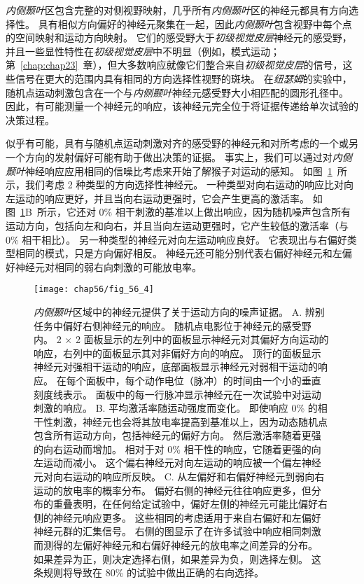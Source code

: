 \textit{内侧颞叶}区包含完整的对侧视野映射，几乎所有\textit{内侧颞叶}区的神经元都具有方向选择性。
具有相似方向偏好的神经元聚集在一起，因此\textit{内侧颞叶}包含视野中每个点的空间映射和运动方向映射。
它们的感受野大于\textit{初级视觉皮层}神经元的感受野，并且一些显性特性在\textit{初级视觉皮层}中不明显（例如，模式运动；第~\ref{chap:chap23}~章），但大多数响应就像它们整合来自\textit{初级视觉皮层}的信号，这些信号在更大的范围内具有相同的方向选择性视野的斑块。
在\textit{纽瑟姆}的实验中，随机点运动刺激包含在一个与\textit{内侧颞叶}神经元感受野大小相匹配的圆形孔径中。
因此，有可能测量一个神经元的响应，该神经元完全位于将证据传递给单次试验的决策过程。


似乎有可能，具有与随机点运动刺激对齐的感受野的神经元和对所考虑的一个或另一个方向的发射偏好可能有助于做出决策的证据。
事实上，我们可以通过对\textit{内侧颞叶}神经响应应用相同的信噪比考虑来开始了解猴子对运动的感知。
如图~\ref{fig:56_4}~所示，我们考虑 2 种类型的方向选择性神经元。
一种类型对向右运动的响应比对向左运动的响应更好，并且当向右运动更强时，它会产生更高的激活率。
如图~\ref{fig:56_4}B~所示，它还对 0\% 相干刺激的基准以上做出响应，因为随机噪声包含所有运动方向，包括向左和向右，并且当向左运动更强时，它产生较低的激活率（与 0\% 相干相比）。
另一种类型的神经元对向左运动响应良好。
它表现出与右偏好类型相同的模式，只是方向偏好相反。
神经元还可能分别代表右偏好神经元和左偏好神经元对相同的弱右向刺激的可能放电率。


\begin{figure}[htbp]
	\centering
	\texttt{[image: chap56/fig\_56\_4]}
	\caption{\textit{内侧颞叶}区域中的神经元提供了关于运动方向的噪声证据。
		A. 辨别任务中偏好右侧神经元的响应。
		随机点电影位于神经元的感受野内。
		2 $\times$ 2 面板显示的左列中的面板显示神经元对其偏好方向运动的响应，右列中的面板显示其对非偏好方向的响应。
		顶行的面板显示神经元对强相干运动的响应，底部面板显示神经元对弱相干运动的响应。
		在每个面板中，每个动作电位（脉冲）的时间由一个小的垂直刻度线表示。
		面板中的每一行脉冲显示神经元在一次试验中对运动刺激的响应\cite{mazurek2003role}。
		B. 平均激活率随运动强度而变化。
		即使响应 0\% 的相干性刺激，神经元也会将其放电率提高到基准以上，因为动态随机点包含所有运动方向，包括神经元的偏好方向。
		然后激活率随着更强的向右运动而增加。
		相对于对 0\% 相干性的响应，它随着更强的向左运动而减小。
		这个偏右神经元对向左运动的响应被一个偏左神经元对向右运动的响应所反映。
		C. 从左偏好和右偏好神经元到弱向右运动的放电率的概率分布。
		偏好右侧的神经元往往响应更多，但分布的重叠表明，在任何给定试验中，偏好左侧的神经元可能比偏好右侧的神经元响应更多。
		这些相同的考虑适用于来自右偏好和左偏好神经元群的汇集信号。
		右侧的图显示了在许多试验中响应相同刺激而测得的左偏好神经元和右偏好神经元的放电率之间差异的分布。
		如果差异为正，则决定选择右侧，如果差异为负，则选择左侧。
		这条规则将导致在 80\% 的试验中做出正确的右向选择。}
	\label{fig:56_4}
\end{figure}


